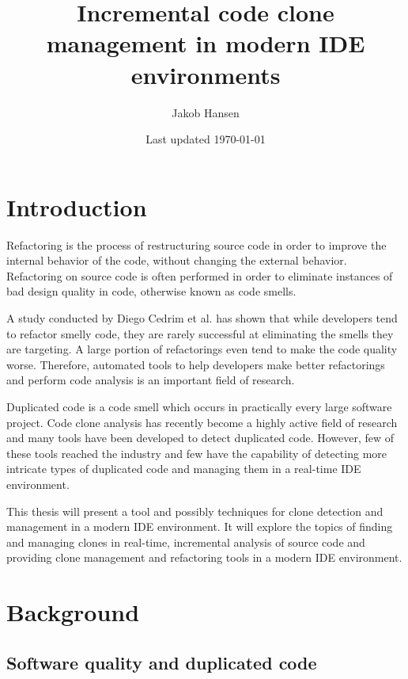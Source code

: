 \documentclass[12pt]{article}
\title{\vspace{-20px}Incremental code clone management in modern IDE environments}
\author{Jakob Hansen}
\date{Last updated \today}
\begin{document}
\maketitle


\tableofcontents

\newpage

\section{Introduction}

Refactoring is the process of restructuring source code in order to improve the internal behavior
of the code, without changing the external behavior\cite[9]{fowlerrefactoring}.
Refactoring on source code is often performed in order to eliminate instances of bad
design quality in code, otherwise known as code smells.

A study conducted by Diego Cedrim et al. has shown that while developers tend to refactor
smelly code, they are rarely successful at eliminating the smells they are
targeting\cite{Rohit_Gheyi_Impact}. A large portion of refactorings even tend to make the
code quality worse. Therefore, automated tools to help developers make better refactorings
and perform code analysis is an important field of research.

Duplicated code is a code smell which occurs in practically every large software project.
Code clone analysis has recently become a highly active field of research and many tools
have been developed to detect duplicated code\cite[7]{Inoue_introduction_to_cc}. However,
few of these tools reached the industry and few have the capability of detecting more
intricate types of duplicated code and managing them in a real-time IDE environment.

This thesis will present a tool and possibly techniques for clone detection and management
in a modern IDE environment. It will explore the topics of finding and managing clones in
real-time, incremental analysis of source code and providing clone management and
refactoring tools in a modern IDE environment.

\section{Background}

\subsection{Software quality and duplicated code}
\end{document}
